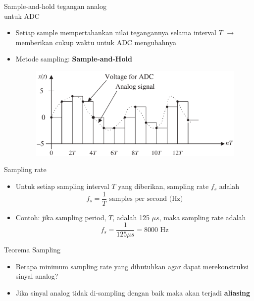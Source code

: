 \documentclass[pdflatex,compress,mathserif]{beamer}
\begin{document}
\begin{frame}{Sample-and-hold tegangan analog\\untuk ADC}
    \begin{itemize}
        \item Setiap sample mempertahankan nilai tegangannya selama interval $T$ $\rightarrow$ memberikan cukup waktu untuk ADC mengubahnya
        \item Metode sampling: \textbf{Sample-and-Hold}
        \begin{figure}
            \includegraphics[width=0.9\linewidth]{./img/img03.png}
        \end{figure}
    \end{itemize}
\end{frame}

\begin{frame}{Sampling rate}
    \begin{itemize}
        \item Untuk setiap sampling interval $T$ yang diberikan, sampling rate $f_s$ adalah
        \begin{equation}
            f_s = \frac{1}{T} \text{ samples per second (Hz)}
        \end{equation}
        \item Contoh: jika sampling period, $T$, adalah 125 $\mu s$, maka sampling rate adalah $$ f_s = \frac{1}{125 \mu s} = 8000 \text{ Hz} $$
    \end{itemize}
\end{frame}

\begin{frame}{Teorema Sampling}
    \begin{itemize}
        \item Berapa minimum sampling rate yang dibutuhkan agar dapat merekonstruksi sinyal analog?
        \item Jika sinyal analog tidak di-sampling dengan baik maka akan terjadi \textbf{aliasing}
    \end{itemize}    
\end{frame}
\end{document}
